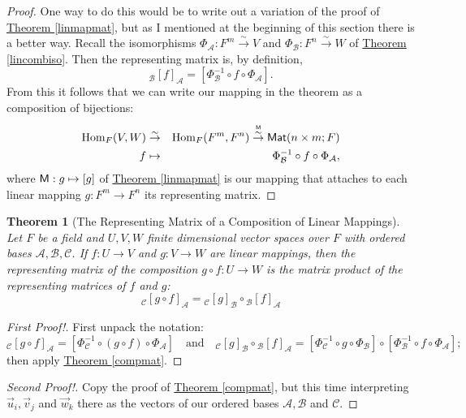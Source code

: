 \documentclass[11pt]{amsbook}
\newtheorem{theorem}{Theorem}[section]
\theoremstyle{definition}
\begin{document}
\begin{proof}
One way to do this would be to write out a variation of the proof of \hyperref[linmapmat]{Theorem \ref{linmapmat}}, but as I mentioned at the beginning of this section there is a better way. Recall the isomorphisms $\Phi_{\mathcal{A}}: F^m \stackrel{\sim}{\to} V$ and $\Phi_{\mathcal{B}}: F^n \stackrel{\sim}{\to} W$ of \hyperref[lincombiso]{Theorem \ref{lincombiso}}. Then the representing matrix is, by definition, $$ {}_{\mathcal{B}}[f]_{\mathcal{A}} = [ \Phi_{\mathcal{B}}^{-1}\circ f \circ \Phi_{\mathcal{A}}].$$ From this it follows that we can write our mapping in the theorem as a composition of bijections:
\begin{eqnarray*}
 {\rm Hom}_F(V,W) & \stackrel{\sim}{\to} & {\rm Hom}_F(F^m, F^n) \stackrel{\stackrel{{\sf M}}{\sim}}{\to} {\sf Mat}(n\times m; F) \\
 f & \mapsto & \Phi_{\mathcal{B}}^{-1}\circ f \circ \Phi_{\mathcal{A}},
\end{eqnarray*}
where ${\sf M}: g\mapsto [g]$ of \hyperref[linmapmat]{Theorem \ref{linmapmat}} is our mapping that attaches to each linear mapping $g:F^m\to F^n$ its representing matrix.
\end{proof}


\begin{theorem}[The Representing Matrix of a Composition of Linear Mappings] \label{compabs} Let $F$ be a field and $U,V,W$ finite dimensional vector spaces over $F$ with ordered bases $\mathcal{A}, \mathcal{B}, \mathcal{C}$.   If $f:U \to V$ and $g: V\to W$ are linear mappings, then the representing matrix of the composition $g\circ f : U \to W$ is the matrix product of the representing matrices of $f$ and $g$:
$${}_{\mathcal{C}}[g\circ f]_{\mathcal{A}} = {}_{\mathcal{C}}[g]_{\mathcal{B}} \circ {}_{\mathcal{B}}[f]_{\mathcal{A}}$$
\end{theorem}
\begin{proof}[First Proof!]
First unpack the notation: $${}_{\mathcal{C}}[g\circ f]_{\mathcal{A}} = [\Phi_{\mathcal{C}}^{-1}\circ (g\circ f) \circ \Phi_{\mathcal{A}}] \quad \text{and} \quad  {}_{\mathcal{C}}[g]_{\mathcal{B}} \circ {}_{\mathcal{B}}[f]_{\mathcal{A}}  =  [\Phi_{\mathcal{C}}^{-1}\circ g \circ \Phi_{\mathcal{B}}]\circ [\Phi_{\mathcal{B}}^{-1}\circ  f \circ \Phi_{\mathcal{A}}];$$ then apply \hyperref[compmat]{Theorem \ref{compmat}}.
\end{proof}
\begin{proof}[Second Proof!]
Copy the proof of \hyperref[compmat]{Theorem \ref{compmat}}, but this time interpreting $\vec{u}_i, \vec{v}_j$ and $\vec{w}_k$ there as the vectors of our ordered bases $\mathcal{A}, \mathcal{B}$ and $\mathcal{C}$.
\end{proof}
\end{document}

